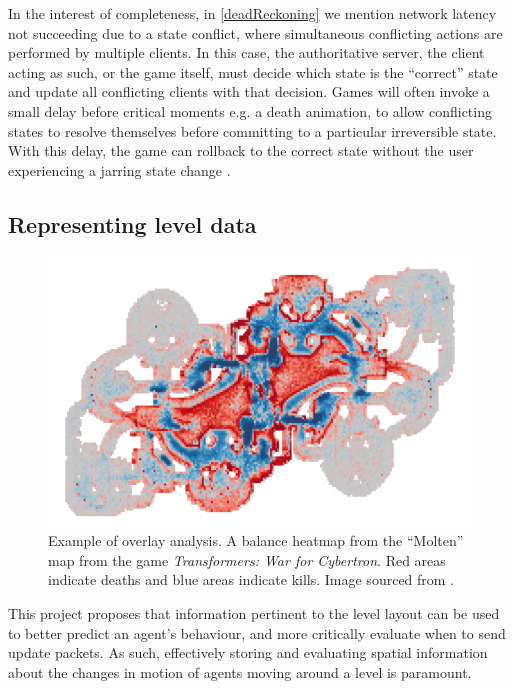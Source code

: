 \documentclass[journal]{IEEEtran}
\begin{document}
In the interest of completeness, in \ref{deadReckoning} we mention network latency not succeeding due to a state conflict, where simultaneous conflicting actions are performed by multiple clients. In this case, the authoritative server, the client acting as such, or the game itself, must decide which state is the ``correct'' state and update all conflicting clients with that decision. Games will often invoke a small delay before critical moments e.g. a death animation, to allow conflicting states to resolve themselves before committing to a particular irreversible state. With this delay, the game can rollback to the correct state without the user experiencing a jarring state change \cite{mauve2000keep}.

\subsection{Representing level data} \label{representingLevelData}

\begin{figure}[h]
    \centering
    \includegraphics[width=0.8\linewidth]{Heatmap1.png}
    \caption{Example of overlay analysis. A balance heatmap from the ``Molten'' map from the game \textit{Transformers: War for Cybertron}. Red areas indicate deaths and blue areas indicate kills. Image sourced from \cite{drachen2013spatial}.}
    \label{fig:hm1}
\end{figure}

This project proposes that information pertinent to the level layout can be used to better predict an agent's behaviour, and more critically evaluate when to send update packets. As such, effectively storing and evaluating spatial information about the changes in motion of agents moving around a level is paramount. 
\end{document}
